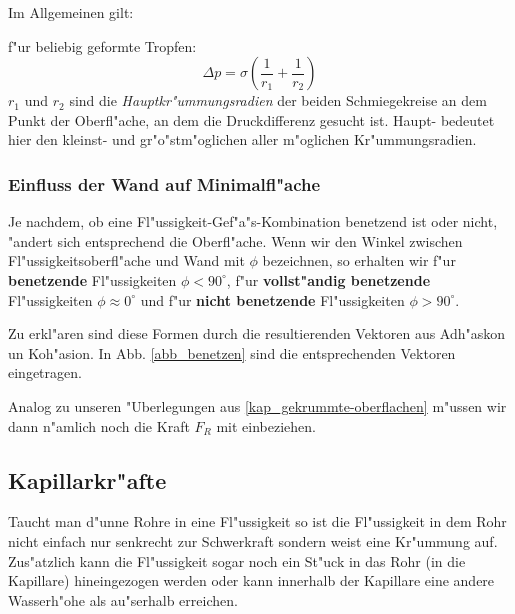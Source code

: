 \bigskip

Im Allgemeinen gilt:
\begin{Wichtig}
    f"ur beliebig geformte Tropfen:
   \begin{equation}
      \label{eq:98}
      \boxed{
\Delta p = \sigma \left ( \frac{1}{r_1} + \frac{1}{r_2} \right ) }
   \end{equation}
$r_1$ und $r_2$ sind die \emph{Hauptkr"ummungsradien} der beiden Schmiegekreise an dem Punkt der Oberfl"ache, an dem die Druckdifferenz gesucht ist. Haupt- bedeutet hier den kleinst- und gr"o"stm"oglichen aller m"oglichen Kr"ummungsradien.
\end{Wichtig}


\subsubsection{Einfluss der Wand auf Minimalfl"ache}
\label{kap_einfluss-wand-auf-minimalflache}


Je nachdem, ob eine Fl"ussigkeit-Gef"a"s-Kombination benetzend ist oder
nicht, "andert sich entsprechend die Oberfl"ache. Wenn wir den Winkel
zwischen Fl"ussigkeitsoberfl"ache und Wand mit $\phi$ bezeichnen, so
erhalten wir f"ur \textbf{benetzende} Fl"ussigkeiten $\phi < 90^\circ$, f"ur
\textbf{vollst"andig benetzende} Fl"ussigkeiten $\phi \approx 0^\circ$
und f"ur \textbf{nicht benetzende} Fl"ussigkeiten $\phi > 90^\circ$.

Zu erkl"aren sind diese Formen durch die resultierenden Vektoren aus
Adh"askon un Koh"asion. In Abb.  \ref{abb_benetzen} sind die
entsprechenden Vektoren eingetragen.

Analog zu unseren "Uberlegungen aus \ref{kap_gekrummte-oberflachen}
m"ussen wir dann n"amlich noch die Kraft $F_R$ mit einbeziehen.



\subsection{Kapillarkr"afte}
\label{kap_kapillarkrafte}

Taucht man d"unne Rohre in eine Fl"ussigkeit so ist die Fl"ussigkeit in
dem Rohr nicht einfach nur senkrecht zur Schwerkraft sondern weist
eine Kr"ummung auf.  Zus"atzlich kann die Fl"ussigkeit sogar noch ein
St"uck in das Rohr (in die Kapillare) hineingezogen werden oder kann
innerhalb der Kapillare eine andere Wasserh"ohe als au"serhalb
erreichen.

